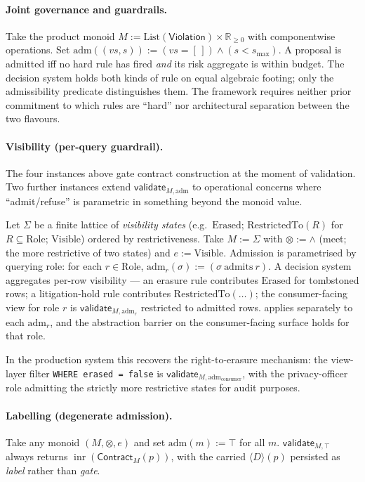 \documentclass[journal,10pt]{IEEEtran}
\theoremstyle{plain}
\theoremstyle{definition}
\theoremstyle{remark}
\DeclareMathOperator{\inr}{inr}
\newcommand{\Contract}{\mathsf{Contract}}
\newcommand{\Violation}{\mathsf{Violation}}
\newcommand{\Validate}{\mathsf{validate}}
\begin{document}
\paragraph*{Joint governance and guardrails.}
Take the product monoid $M := \mathrm{List}(\Violation) \times
\mathbb{R}_{\geq 0}$ with componentwise operations. Set
$\mathrm{adm}((vs, s)) := (vs = [\,]) \wedge (s < s_{\max})$. A
proposal is admitted iff no hard rule has fired \emph{and} its
risk aggregate is within budget. The decision system holds both
kinds of rule on equal algebraic footing; only the admissibility
predicate distinguishes them. The framework requires neither
prior commitment to which rules are ``hard'' nor architectural
separation between the two flavours.

\paragraph*{Visibility (per-query guardrail).}
The four instances above gate contract construction at the moment
of validation. Two further instances extend $\Validate_{M,
\mathrm{adm}}$ to operational concerns where ``admit/refuse'' is
parametric in something beyond the monoid value.

Let $\Sigma$ be a finite lattice of \emph{visibility states} (e.g.\
$\mathrm{Erased}$; $\mathrm{RestrictedTo}(R)$ for $R \subseteq
\mathrm{Role}$; $\mathrm{Visible}$) ordered by restrictiveness.
Take $M := \Sigma$ with $\otimes := \wedge$ (meet; the more
restrictive of two states) and $e := \mathrm{Visible}$.
Admission is parametrised by querying role: for each $r \in
\mathrm{Role}$, $\mathrm{adm}_r(\sigma) := (\sigma\ \text{admits}\
r)$. A decision system aggregates per-row visibility — an
erasure rule contributes $\mathrm{Erased}$ for tombstoned rows;
a litigation-hold rule contributes $\mathrm{RestrictedTo}(\dots)$;
the consumer-facing view for role $r$ is
$\Validate_{M, \mathrm{adm}_r}$ restricted to admitted rows.
\Cref{thm:static-M} applies separately to each $\mathrm{adm}_r$,
and the abstraction barrier on the consumer-facing surface holds
for that role.

In the production system this recovers the right-to-erasure
mechanism: the view-layer filter \texttt{WHERE erased = false} is
$\Validate_{M, \mathrm{adm}_{\mathrm{consumer}}}$, with the
privacy-officer role admitting the strictly more restrictive
states for audit purposes.

\paragraph*{Labelling (degenerate admission).}
Take any monoid $(M, \otimes, e)$ and set $\mathrm{adm}(m) := \top$
for all $m$. $\Validate_{M, \top}$ always returns
$\inr(\Contract_M(p))$, with the carried $\langle D \rangle(p)$
persisted as \emph{label} rather than \emph{gate}.
\end{document}
